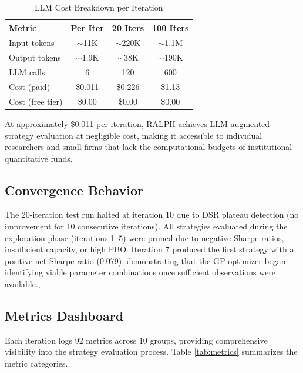 \documentclass[conference]{IEEEtran}
\begin{document}
\begin{table}[h!]
\centering
\caption{LLM Cost Breakdown per Iteration}
\label{tab:cost}
\begin{tabular}{@{}lccc@{}}
\toprule
\textbf{Metric} & \textbf{Per Iter} & \textbf{20 Iters} & \textbf{100 Iters} \\
\midrule
Input tokens & $\sim$11K & $\sim$220K & $\sim$1.1M \\
Output tokens & $\sim$1.9K & $\sim$38K & $\sim$190K \\
LLM calls & 6 & 120 & 600 \\
Cost (paid) & \$0.011 & \$0.226 & \$1.13 \\
Cost (free tier) & \$0.00 & \$0.00 & \$0.00 \\
\bottomrule
\end{tabular}
\end{table}

At approximately \$0.011 per iteration, RALPH achieves LLM-augmented strategy evaluation at negligible cost, making it accessible to individual researchers and small firms that lack the computational budgets of institutional quantitative funds.

\subsection{Convergence Behavior}

The 20-iteration test run halted at iteration 10 due to DSR plateau detection (no improvement for 10 consecutive iterations). All strategies evaluated during the exploration phase (iterations 1--5) were pruned due to negative Sharpe ratios, insufficient capacity, or high PBO. Iteration 7 produced the first strategy with a positive net Sharpe ratio (0.079), demonstrating that the GP optimizer began identifying viable parameter combinations once sufficient observations were available.,

\subsection{Metrics Dashboard}

Each iteration logs 92 metrics across 10 groups, providing comprehensive visibility into the strategy evaluation process. Table \ref{tab:metrics} summarizes the metric categories.
\end{document}
